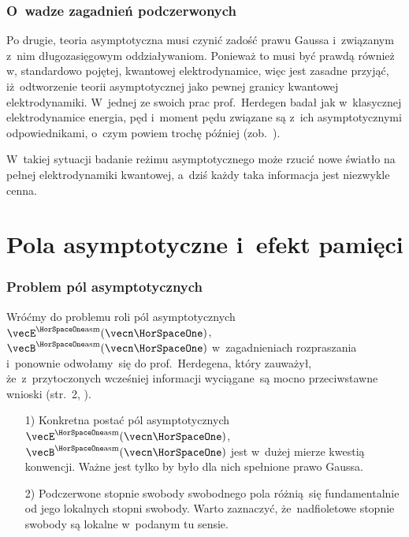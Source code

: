 \documentclass[10pt,t]{beamer}
\begin{document}
\begin{frame}
  \frametitle{O~wadze zagadnień podczerwonych}


  Po drugie, teoria asymptotyczna musi czynić zadość prawu Gaussa
  i~związanym z~nim długozasięgowym oddziaływaniom. Ponieważ to musi być
  prawdą również w, standardowo pojętej, kwantowej elektrodynamice, więc
  jest zasadne przyjąć, iż~odtworzenie teorii asymptotycznej jako pewnej
  granicy kwantowej elektrodynamiki. W~jednej ze swoich prac prof.~Herdegen
  badał jak w~\alert{klasycznej} elektrodynamice energia, pęd i~moment pędu
  związane są z~ich asymptotycznymi odpowiednikami, o~czym powiem
  trochę później
  (zob.~\parencite{Herdegen-Long-range-effects-in-asymptotic-ETC-Pub-1995}).

  W~takiej sytuacji badanie reżimu asymptotycznego może rzucić nowe światło
  na pełnej elektrodynamiki kwantowej, a~dziś każdy taka informacja jest
  niezwykle cenna.

\end{frame}










\section{Pola asymptotyczne i~efekt pamięci}



\begin{frame}
  \frametitle{Problem pól asymptotycznych}


  Wróćmy do problemu roli pól asymptotycznych $\vecEasm$, $\vecBasm$
  w~zagadnieniach rozpraszania i~ponownie odwołamy~się do
  prof.~Herdegena, który zauważył, że~z~przytoczonych wcześniej informacji
  wyciągane~są mocno przeciwstawne wnioski (str.~2,
  \parencite{Herdegen-Infrared-structure-beyond-locality-ETC-Ver-2024}).

  \begin{itemize}

  \item[1)] Konkretna postać pól asymptotycznych $\vecEasm$, $\vecBasm$
    jest w~dużej mierze kwestią konwencji. Ważne jest tylko by było
    dla nich spełnione prawo Gaussa.

  \item[2)] Podczerwone stopnie swobody swobodnego pola różnią~się
    fundamentalnie od jego lokalnych stopni swobody. Warto zaznaczyć,
    że~nadfioletowe stopnie swobody są lokalne w~podanym tu sensie.

  \end{itemize}

\end{frame}
\end{document}
